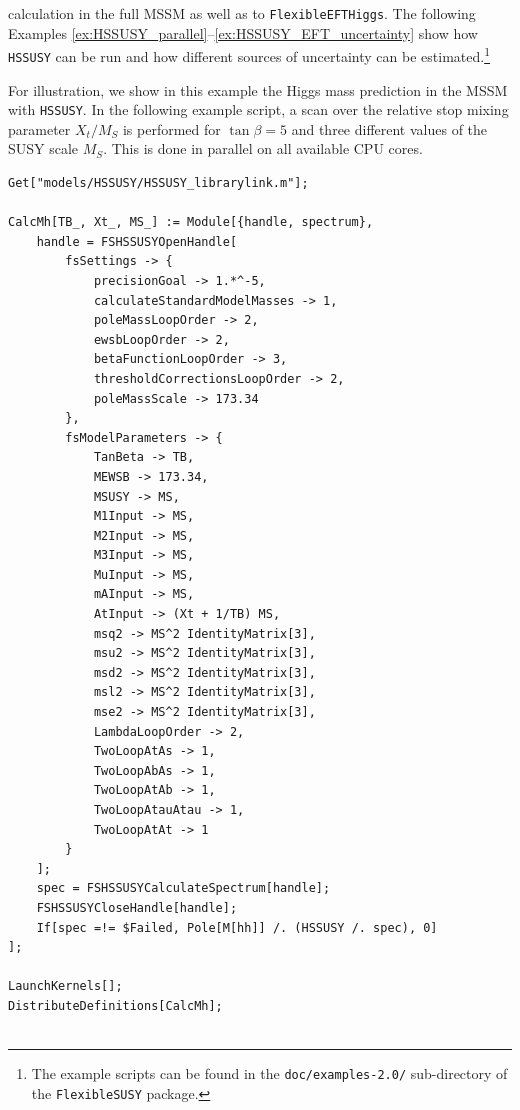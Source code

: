 \documentclass[final,3p,11pt,pdflatex]{elsarticle}
\makeatletter
\newcommand{\modelname}[1]{\texttt{#1}\@\xspace}
\newcommand{\fs}{\texttt{FlexibleSUSY}\@\xspace}
\newcommand{\HSSUSY}{\modelname{HSSUSY}}
\newcommand{\feft}{\texttt{Flex\-ib\-le\-EFT\-Higgs}\@\xspace}
\newcommand{\code}[1]{\lstinline|#1|}  %
\newcommand{\MS}{\ensuremath{M_S}\xspace}
\makeatother
\begin{document}
calculation in the full MSSM as well as to \feft.  The following
Examples \ref{ex:HSSUSY_parallel}--\ref{ex:HSSUSY_EFT_uncertainty}
show how \HSSUSY can be run and how different sources of uncertainty
can be estimated.\footnote{The example scripts can be found in the
  \code{doc/examples-2.0/} sub-directory of the \fs package.}
%
\begin{example}[label=ex:HSSUSY_parallel]
  For illustration, we show in this example the Higgs mass prediction
  in the MSSM with \HSSUSY.  In the following example script, a scan
  over the relative stop mixing parameter $X_t/\MS$ is performed for
  $\tan\beta = 5$ and three different values of the SUSY scale $\MS$.
  This is done in parallel on all available CPU cores.
\begin{lstlisting}
Get["models/HSSUSY/HSSUSY_librarylink.m"];

CalcMh[TB_, Xt_, MS_] := Module[{handle, spectrum},
    handle = FSHSSUSYOpenHandle[
        fsSettings -> {
            precisionGoal -> 1.*^-5,
            calculateStandardModelMasses -> 1,
            poleMassLoopOrder -> 2,
            ewsbLoopOrder -> 2,
            betaFunctionLoopOrder -> 3,
            thresholdCorrectionsLoopOrder -> 2,
            poleMassScale -> 173.34
        },
        fsModelParameters -> {
            TanBeta -> TB,
            MEWSB -> 173.34,
            MSUSY -> MS,
            M1Input -> MS,
            M2Input -> MS,
            M3Input -> MS,
            MuInput -> MS,
            mAInput -> MS,
            AtInput -> (Xt + 1/TB) MS,
            msq2 -> MS^2 IdentityMatrix[3],
            msu2 -> MS^2 IdentityMatrix[3],
            msd2 -> MS^2 IdentityMatrix[3],
            msl2 -> MS^2 IdentityMatrix[3],
            mse2 -> MS^2 IdentityMatrix[3],
            LambdaLoopOrder -> 2,
            TwoLoopAtAs -> 1,
            TwoLoopAbAs -> 1,
            TwoLoopAtAb -> 1,
            TwoLoopAtauAtau -> 1,
            TwoLoopAtAt -> 1
        }
    ];
    spec = FSHSSUSYCalculateSpectrum[handle];
    FSHSSUSYCloseHandle[handle];
    If[spec =!= $Failed, Pole[M[hh]] /. (HSSUSY /. spec), 0]
];

LaunchKernels[];
DistributeDefinitions[CalcMh];


\end{lstlisting}
\end{example}
\end{document}
